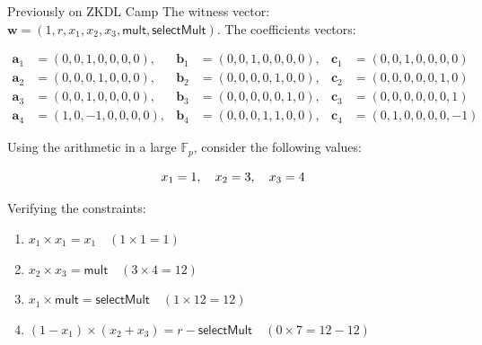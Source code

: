 \documentclass{zkdl-presentation-template}
\begin{document}
    \begin{frame}[fragile]{Previously on ZKDL Camp}
        The witness vector: $\boldsymbol{w} = (1, r, x_1, x_2, x_3, \mathsf{mult}, \mathsf{selectMult})$.
         The coefficients vectors:

        \vspace{-20pt}\small

        \begin{align*}
            \boldsymbol{a}_1 &= (0, 0, 1, 0, 0, 0, 0), & \boldsymbol{b}_1 &= (0, 0, 1, 0, 0, 0, 0), & \boldsymbol{c}_1 &= (0, 0, 1, 0, 0, 0, 0) \\
            \boldsymbol{a}_2 &= (0, 0, 0, 1, 0, 0, 0), & \boldsymbol{b}_2 &= (0, 0, 0, 0, 1, 0, 0), & \boldsymbol{c}_2 &= (0, 0, 0, 0, 0, 1, 0) \\
            \boldsymbol{a}_3 &= (0, 0, 1, 0, 0, 0, 0), & \boldsymbol{b}_3 &= (0, 0, 0, 0, 0, 1, 0), & \boldsymbol{c}_3 &= (0, 0, 0, 0, 0, 0, 1) \\
            \boldsymbol{a}_4 &= (1, 0, -1, 0, 0, 0, 0), & \boldsymbol{b}_4 &= (0, 0, 0, 1, 1, 0, 0), & \boldsymbol{c}_4 &= (0, 1, 0, 0, 0, 0, -1)
        \end{align*}\normalsize

         \vspace{-10pt}

        Using the arithmetic in a large $\mathbb{F}_p$, consider the following values:

        \vspace{-15pt}
        \begin{equation*}
            x_1 = 1, \quad x_2 = 3, \quad x_3 = 4
            \vspace{-5pt}
        \end{equation*}

        Verifying the constraints:
        \begin{enumerate}
            \item \( x_1 \times x_1 = x_1 \quad (1 \times 1 = 1) \)
            \item \( x_2 \times x_3 = \mathsf{mult} \quad (3 \times 4 = 12) \)
            \item \( x_1 \times \mathsf{mult} = \mathsf{selectMult} \quad (1 \times 12 = 12) \)
            \item \( (1 - x_1) \times (x_2 + x_3) = r - \mathsf{selectMult} \quad (0 \times 7 = 12 - 12) \)
        \end{enumerate}
    \end{frame}
\end{document}
